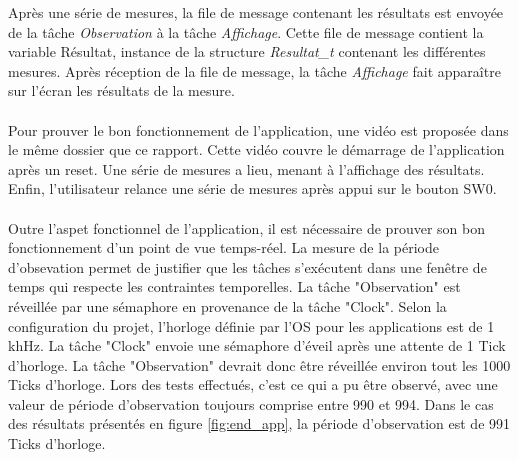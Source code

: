 Après une série de mesures, la file de message contenant les résultats est envoyée de la tâche \textit{Observation} à la tâche \textit{Affichage}.
Cette file de message contient la variable Résultat, instance de la structure \textit{Resultat\_t} contenant les différentes mesures.
Après réception de la file de message, la tâche \textit{Affichage} fait apparaître sur l'écran les résultats de la mesure.
\\\\
Pour prouver le bon fonctionnement de l'application, une vidéo est proposée dans le même dossier que ce rapport.
Cette vidéo couvre le démarrage de l'application après un reset. 
Une série de mesures a lieu, menant à l'affichage des résultats.
Enfin, l'utilisateur relance une série de mesures après appui sur le bouton SW0.
\\\\
Outre l'aspet fonctionnel de l'application, il est nécessaire de prouver son bon fonctionnement d'un point de vue temps-réel.
La mesure de la période d'obsevation permet de justifier que les tâches s'exécutent dans une fenêtre de temps qui respecte les contraintes temporelles.
La tâche "Observation" est réveillée par une sémaphore en provenance de la tâche "Clock".
Selon la configuration du projet, l'horloge définie par l'OS pour les applications est de 1 khHz.
La tâche "Clock" envoie une sémaphore d'éveil après une attente de 1 Tick d'horloge.
La tâche "Observation" devrait donc être réveillée environ tout les 1000 Ticks d'horloge.
Lors des tests effectués, c'est ce qui a pu être observé, avec une valeur de période d'observation toujours comprise entre 990 et 994.
Dans le cas des résultats présentés en figure \ref{fig:end_app}, la période d'observation est de 991 Ticks d'horloge.